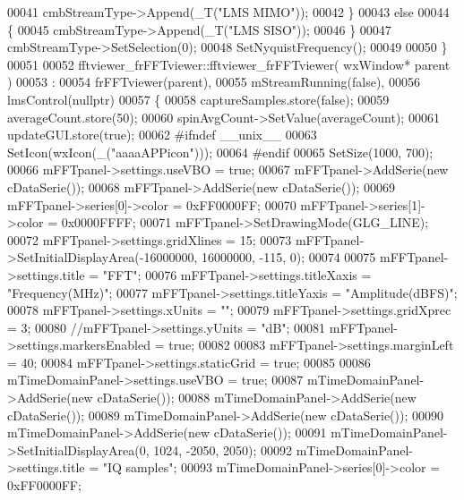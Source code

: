 \begin{DoxyCode}
00041         cmbStreamType->Append(_T(\textcolor{stringliteral}{"LMS MIMO"}));
00042     \}
00043     \textcolor{keywordflow}{else}
00044     \{
00045         cmbStreamType->Append(_T(\textcolor{stringliteral}{"LMS SISO"}));
00046     \}
00047     cmbStreamType->SetSelection(0);
00048     SetNyquistFrequency();
00049 
00050 \}
00051 
00052 fftviewer_frFFTviewer::fftviewer_frFFTviewer( wxWindow* parent )
00053 :
00054 frFFTviewer(parent),
00055 mStreamRunning(false),
00056 lmsControl(nullptr)
00057 \{
00058     captureSamples.store(\textcolor{keyword}{false});
00059     averageCount.store(50);
00060     spinAvgCount->SetValue(averageCount);
00061     updateGUI.store(\textcolor{keyword}{true});
00062 \textcolor{preprocessor}{#ifndef \_\_unix\_\_}
00063     SetIcon(wxIcon(\_(\textcolor{stringliteral}{"aaaaAPPicon"})));
00064 \textcolor{preprocessor}{#endif}
00065     SetSize(1000, 700);
00066     mFFTpanel->settings.useVBO = \textcolor{keyword}{true};
00067     mFFTpanel->AddSerie(\textcolor{keyword}{new} cDataSerie());
00068     mFFTpanel->AddSerie(\textcolor{keyword}{new} cDataSerie());
00069     mFFTpanel->series[0]->color = 0xFF0000FF;
00070     mFFTpanel->series[1]->color = 0x0000FFFF;
00071     mFFTpanel->SetDrawingMode(GLG_LINE);
00072     mFFTpanel->settings.gridXlines = 15;
00073     mFFTpanel->SetInitialDisplayArea(-16000000, 16000000, -115, 0);
00074 
00075     mFFTpanel->settings.title = \textcolor{stringliteral}{"FFT"};
00076     mFFTpanel->settings.titleXaxis = \textcolor{stringliteral}{"Frequency(MHz)"};
00077     mFFTpanel->settings.titleYaxis = \textcolor{stringliteral}{"Amplitude(dBFS)"};
00078     mFFTpanel->settings.xUnits = \textcolor{stringliteral}{""};
00079     mFFTpanel->settings.gridXprec = 3;
00080     \textcolor{comment}{//mFFTpanel->settings.yUnits = "dB";}
00081     mFFTpanel->settings.markersEnabled = \textcolor{keyword}{true};
00082 
00083     mFFTpanel->settings.marginLeft = 40;
00084     mFFTpanel->settings.staticGrid = \textcolor{keyword}{true};
00085 
00086     mTimeDomainPanel->settings.useVBO = \textcolor{keyword}{true};
00087     mTimeDomainPanel->AddSerie(\textcolor{keyword}{new} cDataSerie());
00088     mTimeDomainPanel->AddSerie(\textcolor{keyword}{new} cDataSerie());
00089     mTimeDomainPanel->AddSerie(\textcolor{keyword}{new} cDataSerie());
00090     mTimeDomainPanel->AddSerie(\textcolor{keyword}{new} cDataSerie());
00091     mTimeDomainPanel->SetInitialDisplayArea(0, 1024, -2050, 2050);
00092     mTimeDomainPanel->settings.title = \textcolor{stringliteral}{"IQ samples"};
00093     mTimeDomainPanel->series[0]->color = 0xFF0000FF;

\end{DoxyCode}
